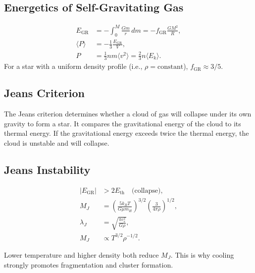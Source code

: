 \subsection{Energetics of Self-Gravitating Gas}
\begin{theory}
\begin{align}
    E_{\text{GR}} &= -\int_0^M \frac{Gm}{r}\,dm = -f_{\text{GR}}\frac{GM^2}{R}, \\
    \langle P\rangle &= -\frac{1}{3}\frac{E_{\text{GR}}}{V}, \\
    P &= \frac{1}{3}nm\langle v^2\rangle = \frac{2}{3}n\langle E_k\rangle.
\end{align}
For a star with a uniform density profile (i.e., $\rho = \text{constant}$), $f_{\text{GR}}\approx 3/5$.
\end{theory}
\bigskip\noindent \bigskip\noindent \bigskip\noindent
\subsection{Jeans Criterion}
\begin{intuition}
The Jeans criterion determines whether a cloud of gas will collapse under its own gravity to form a star. It compares the gravitational energy of the cloud to its thermal energy. If the gravitational energy exceeds twice the thermal energy, the cloud is unstable and will collapse.
\end{intuition}
\bigskip\noindent \bigskip\noindent \bigskip\noindent
\subsection{Jeans Instability}
\begin{theory}
\begin{align}
    |E_{\text{GR}}| &> 2E_{\text{th}} \quad \text{(collapse)}, \\
    M_J &= \left(\frac{5k_B T}{G\mu m_H}\right)^{3/2}\left(\frac{3}{4\pi\rho}\right)^{1/2}, \\
    \lambda_J &= \sqrt{\frac{\pi c_s^2}{G\rho}}, \\
    M_J &\propto T^{3/2}\rho^{-1/2}.
\end{align}
\end{theory}

\begin{importantnote}
Lower temperature and higher density both reduce $M_J$.
This is why cooling strongly promotes fragmentation and cluster formation.
\end{importantnote}

